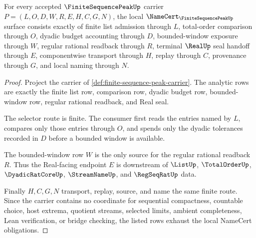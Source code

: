 \begin{theorem}
\label{thm:finite-sequence-peak-namecert-obligations}
For every accepted $\FiniteSequencePeakUp$ carrier $P=(L,O,D,W,R,E,H,C,G,N)$, the local $\NameCert_{\FiniteSequencePeakUp}$ surface consists exactly of finite list admission through $L$, total-order comparison through $O$, dyadic budget accounting through $D$, bounded-window exposure through $W$, regular rational readback through $R$, terminal $\RealUp$ seal handoff through $E$, componentwise transport through $H$, replay through $C$, provenance through $G$, and local naming through $N$.
\end{theorem}
\begin{proof}
Project the carrier of \autoref{def:finite-sequence-peak-carrier}. The analytic rows are exactly the finite list row, comparison row, dyadic budget row, bounded-window row, regular rational readback, and Real seal.

The selector route is finite. The consumer first reads the entries named by $L$, compares only those entries through $O$, and spends only the dyadic tolerances recorded in $D$ before a bounded window is available.

The bounded-window row $W$ is the only source for the regular rational readback $R$. Thus the Real-facing endpoint $E$ is downstream of $\ListUp$, $\TotalOrderUp$, $\DyadicRatCoreUp$, $\StreamNameUp$, and $\RegSeqRatUp$ data.

Finally $H,C,G,N$ transport, replay, source, and name the same finite route. Since the carrier contains no coordinate for sequential compactness, countable choice, host extrema, quotient streams, selected limits, ambient completeness, Lean verification, or bridge checking, the listed rows exhaust the local NameCert obligations.
\end{proof}

